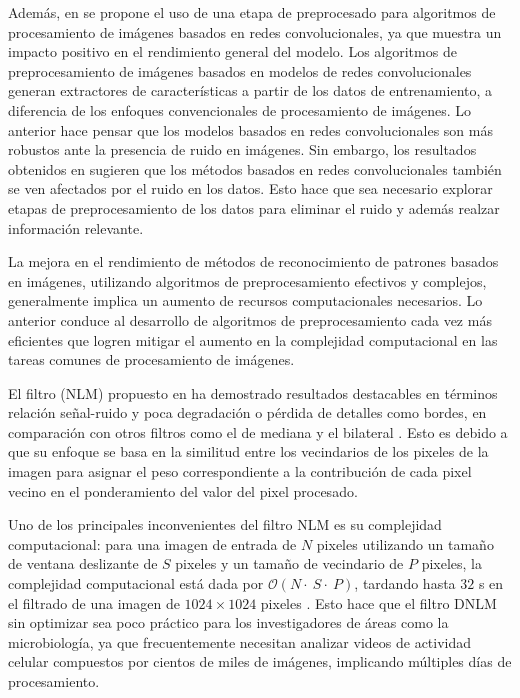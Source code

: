 Adem\'as, en \cite{CNN_DNLM} se propone el uso de una etapa de preprocesado para algoritmos de procesamiento de im\'agenes basados en redes convolucionales, ya que muestra un impacto positivo en el rendimiento general del modelo. Los algoritmos de preprocesamiento de im\'agenes basados en modelos de redes convolucionales generan extractores de caracter\'isticas a partir de los datos de entrenamiento, a diferencia de los enfoques convencionales de procesamiento de im\'agenes. Lo anterior hace pensar que los modelos basados en redes convolucionales son m\'as robustos ante la presencia de ruido en im\'agenes. Sin embargo, los resultados obtenidos en \cite{CNN_DNLM} sugieren que los m\'etodos basados en redes convolucionales tambi\'en se ven afectados por el ruido en los datos. Esto hace que sea necesario explorar etapas de preprocesamiento de los datos para eliminar el ruido y adem\'as realzar informaci\'on relevante.

La mejora en el rendimiento de m\'etodos de reconocimiento de patrones basados en im\'agenes, utilizando algoritmos de preprocesamiento efectivos y complejos, generalmente implica un aumento de recursos computacionales necesarios. Lo anterior conduce al desarrollo de algoritmos de preprocesamiento cada vez m\'as eficientes que logren mitigar el aumento en la complejidad computacional en las tareas comunes de procesamiento de im\'agenes. 


El filtro  (NLM) propuesto en \cite{buades2005non} ha demostrado resultados destacables en t\'erminos relaci\'on se\~nal-ruido y poca degradaci\'on o p\'erdida de detalles como bordes, en comparaci\'on con otros filtros como el de mediana y el bilateral \cite{CONCAPAN2016}. Esto es debido a que su enfoque se basa en la similitud entre los vecindarios de los pixeles de la imagen para asignar el peso correspondiente a la contribuci\'on de cada pixel vecino en el ponderamiento del valor del pixel procesado. 

Uno de los principales inconvenientes del filtro NLM es su complejidad computacional: para una imagen de entrada de $N$ pixeles utilizando un tamaño de ventana deslizante de $S$ pixeles y un tamaño de vecindario de $P$ pixeles, la complejidad computacional est\'a dada por $\mathcal{O}(N\cdot~S\cdot~P)$, tardando hasta $32$ s en el filtrado de una imagen de $1024 \times 1024$ pixeles \cite{Zhu2016}. Esto hace que el filtro DNLM sin optimizar sea poco pr\'actico para los investigadores de \'areas como la microbiolog\'ia, ya que frecuentemente necesitan analizar videos de actividad celular compuestos por cientos de miles de im\'agenes, implicando m\'ultiples d\'ias de procesamiento. 

